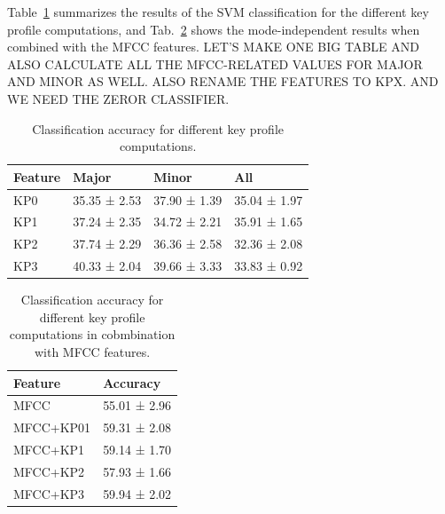 \documentclass{article}
\begin{document}
Table~\ref{tab:accuracyPC} summarizes the results of the SVM classification for the different key profile computations, and Tab.~\ref{tab:accuracyPC+MFCC} shows the mode-independent results when combined with the MFCC features. LET'S MAKE ONE BIG TABLE AND ALSO CALCULATE ALL THE MFCC-RELATED VALUES FOR MAJOR AND MINOR AS WELL. ALSO RENAME THE FEATURES TO KPX. AND WE NEED THE ZEROR CLASSIFIER.
\begin{table}
\begin{center}
    \begin{tabular}{|l|l|l|l|}
      \hline 
	\bf Feature & \bf Major & \bf Minor & \bf All\\
	\hline
	KP0 & 35.35 ± 2.53 & 37.90 ± 1.39 & 35.04 ± 1.97\\
	\hline
	KP1 & 37.24 ± 2.35 & 34.72 ± 2.21 & 35.91 ± 1.65\\
	\hline
	KP2 & 37.74 ± 2.29 & 36.36 ± 2.58 & 32.36 ± 2.08\\
	\hline
	KP3 & 40.33 ± 2.04 & 39.66 ± 3.33 & 33.83 ± 0.92\\
 	\hline

    \end{tabular}
    \caption{Classification accuracy for different key profile computations.}
    \label{tab:accuracyPC}
  \end{center}
\end{table}

\begin{table}
\begin{center}
    \begin{tabular}{|l|l|}
      \hline 
	\bf Feature & \bf Accuracy\\
	\hline
	MFCC & 55.01 ± 2.96\\
	\hline
	MFCC+KP01 & 59.31 ± 2.08\\
	\hline
	MFCC+KP1 & 59.14 ± 1.70\\
	\hline
	MFCC+KP2 & 57.93 ± 1.66\\
 	\hline
	MFCC+KP3 & 59.94 ± 2.02\\
 	\hline

    \end{tabular}
    \caption{Classification accuracy for different key profile computations in cobmbination with MFCC features.}
    \label{tab:accuracyPC+MFCC}
  \end{center}
\end{table}

\end{document}
